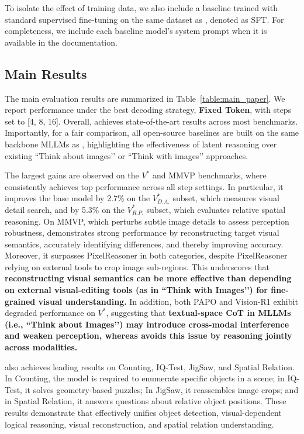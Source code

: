 To isolate the effect of training data, we also include a baseline trained with standard supervised fine-tuning on the same dataset as \modelname, denoted as SFT. For completeness, we include each baseline model’s system prompt when it is available in the documentation.




\subsection{Main Results}
The main evaluation results are summarized in Table~\ref{table:main_paper}. We report performance under the best decoding strategy, \textbf{Fixed Token}, with \modelname steps set to [4, 8, 16]. Overall, \modelname achieves state-of-the-art results across most benchmarks. Importantly, for a fair comparison, all open-source baselines are built on the same backbone MLLMs as \modelname, highlighting the effectiveness of latent reasoning over existing “Think about images’’ or “Think with images’’ approaches.

The largest gains are observed on the $V^*$ and MMVP benchmarks, where \modelname consistently achieves top performance across all step settings. 
In particular, it improves the base model by 2.7\% on the $V^*_{D.A.}$ subset, which measures visual detail search, and by 5.3\% on the $V^*_{R.P.}$ subset, which evaluates relative spatial reasoning. On MMVP, which perturbs subtle image details to assess perception robustness, \modelname demonstrates strong performance by reconstructing target visual semantics, accurately identifying differences, and thereby improving accuracy. Moreover, it surpasses PixelReasoner in both categories, despite PixelReasoner relying on external tools to crop image sub-regions. This underscores that \textbf{reconstructing visual semantics can be more effective than depending on external visual-editing tools (as in “Think with Images’’) for fine-grained visual understanding.} In addition, both PAPO and Vision-R1 exhibit degraded performance on $V^*$, suggesting that \textbf{textual-space CoT in MLLMs (i.e., “Think about Images’’) may introduce cross-modal interference and weaken perception, whereas \modelname avoids this issue by reasoning jointly across modalities.}

\modelname also achieves leading results on Counting, IQ-Test, JigSaw, and Spatial Relation. In Counting, the model is required to enumerate specific objects in a scene; in IQ-Test, it solves geometry-based puzzles; In JigSaw, it reassembles image crops; and in Spatial Relation, it answers questions about relative object positions. These results demonstrate that \modelfullname effectively unifies object detection, visual-dependent logical reasoning, visual reconstruction, and spatial relation understanding.

